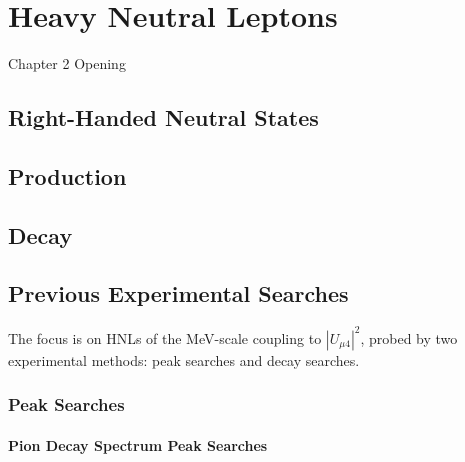 
\chapter{Heavy Neutral Leptons}

\ifpdf
    \graphicspath{{Chapter2/Figs/Raster/}{Chapter2/Figs/PDF/}{Chapter2/Figs/}}
\else
    \graphicspath{{Chapter2/Figs/Vector/}{Chapter2/Figs/}}
\fi


Chapter 2 Opening

\section{Right-Handed Neutral States}

\section{Production}

\section{Decay}

\section{Previous Experimental Searches}



The focus is on HNLs of the MeV-scale coupling to $|U_{\mu4}|^{2}$, probed by two experimental methods: peak searches and decay searches.

\subsection{Peak Searches}

\subsubsection{Pion Decay Spectrum Peak Searches}

